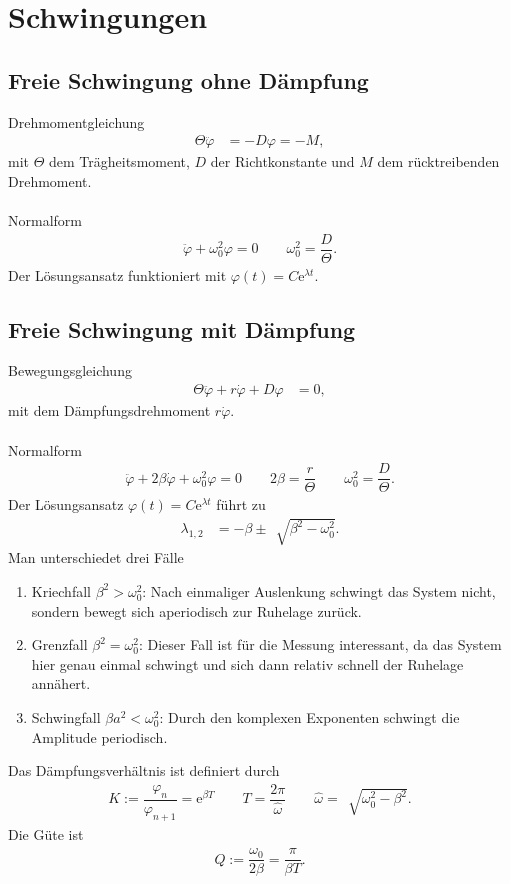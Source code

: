\section{Schwingungen}
\subsection{Freie Schwingung ohne Dämpfung}
Drehmomentgleichung
\begin{align} 
        \Theta \ddot{\varphi }&=-D\varphi =-M
,\end{align} 
mit $\Theta $ dem Trägheitsmoment, $D$ der Richtkonstante und $M$ dem rücktreibenden Drehmoment.\\\\
Normalform
\begin{align} 
        \ddot{\varphi }+\omega _0^2\varphi =0\qquad \omega _0^2=\dfrac{D}{\Theta }
.\end{align} 
Der Lösungsansatz funktioniert mit $\varphi \left(t\right)=C\text{e}^{\lambda t}$.

\subsection{Freie Schwingung mit Dämpfung}
Bewegungsgleichung
\begin{align} 
        \Theta \ddot{\varphi }+r\dot{\varphi }+D\varphi &=0
,\end{align} 
mit dem Dämpfungsdrehmoment $r\dot{\varphi }$.\\\\
Normalform
\begin{align} 
        \ddot{\varphi }+2\beta \dot{\varphi }+\omega _0^2\varphi =0\qquad 2\beta =\dfrac{r}{\Theta }\qquad \omega _0^2=\dfrac{D}{\Theta }
.\end{align} 
Der Lösungsansatz $\varphi \left(t\right)=C\text{e}^{\lambda t}$ führt zu
\begin{align} 
        \lambda _{1,2}&=-\beta \pm\,\sqrt[]{\beta ^2-\omega _0^2}
.\end{align} 
Man unterschiedet drei Fälle
\begin{enumerate}[label=--]
        \item Kriechfall $\beta ^2>\omega _0^2$: Nach einmaliger Auslenkung schwingt das System nicht, sondern bewegt sich aperiodisch zur Ruhelage zurück.
        \item Grenzfall $\beta ^2=\omega _0^2$: Dieser Fall ist für die Messung interessant, da das System hier genau einmal schwingt und sich dann relativ schnell der Ruhelage annähert.
        \item Schwingfall $\beta a^2<\omega _0^2$: Durch den komplexen Exponenten schwingt die Amplitude periodisch.
\end{enumerate}
Das Dämpfungsverhältnis ist definiert durch
\begin{align} 
        K:=\dfrac{\varphi _n}{\varphi _{n+1}}=\text{e}^{\beta T}\qquad T=\dfrac{2\pi }{\hat{\omega }}\qquad \hat{\omega }=\,\sqrt[]{\omega _0^2-\beta ^2}
.\end{align} 
Die Güte ist
\begin{align} 
        Q:=\dfrac{\omega _0}{2\beta }=\dfrac{\pi }{\beta T}
.\end{align} 

